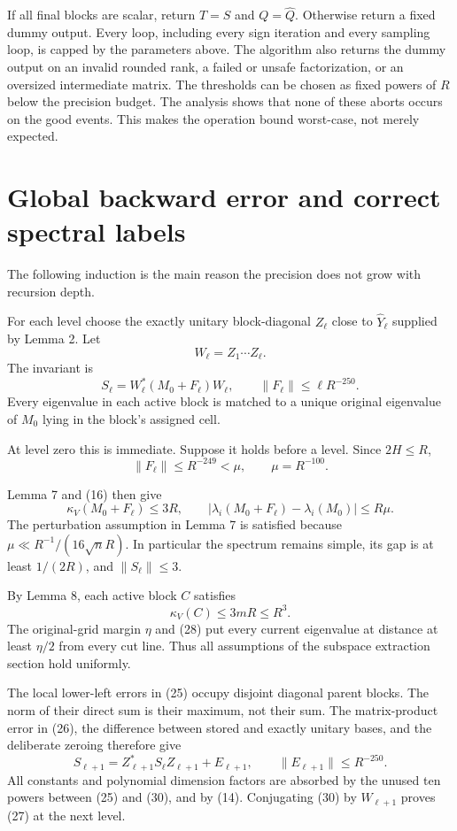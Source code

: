 \documentclass[10pt,a4paper]{article}
\begin{document}
If all final blocks are scalar, return \(T=S\) and \(Q=\widehat Q\).
Otherwise return a fixed dummy output. Every loop, including every sign
iteration and every sampling loop, is capped by the parameters above.
The algorithm also returns the dummy output on an invalid rounded rank,
a failed or unsafe factorization, or an oversized intermediate matrix.
The thresholds can be chosen as fixed powers of \(R\) below the
precision budget. The analysis shows that none of these aborts occurs on
the good events. This makes the operation bound worst-case, not merely
expected.

\section{Global backward error and correct spectral
labels}\label{global-backward-error-and-correct-spectral-labels}

The following induction is the main reason the precision does not grow
with recursion depth.

For each level choose the exactly unitary block-diagonal \(Z_\ell\)
close to \(\widehat Y_\ell\) supplied by Lemma 2. Let \[
 W_\ell=Z_1\cdots Z_\ell.
\] The invariant is \[
 S_\ell=W_\ell^*(M_0+F_\ell)W_\ell,
 \qquad\|F_\ell\|\le\ell R^{-250}.
 \tag{27}
\] Every eigenvalue in each active block is matched to a unique original
eigenvalue of \(M_0\) lying in the block's assigned cell.

At level zero this is immediate. Suppose it holds before a level. Since
\(2H\le R\), \[
 \|F_\ell\|\le R^{-249}<\mu,
 \qquad\mu=R^{-100}.
\]

Lemma 7 and (16) then give \[
 \kappa_V(M_0+F_\ell)\le3R,
 \qquad
 |\lambda_i(M_0+F_\ell)-\lambda_i(M_0)|\le R\mu.
 \tag{28}
\] The perturbation assumption in Lemma 7 is satisfied because
\(\mu\ll R^{-1}/(16\sqrt n R)\). In particular the spectrum remains
simple, its gap is at least \(1/(2R)\), and \(\|S_\ell\|\le3\).

By Lemma 8, each active block \(C\) satisfies \[
 \kappa_V(C)\le3mR\le R^3.
 \tag{29}
\] The original-grid margin \(\eta\) and (28) put every current
eigenvalue at distance at least \(\eta/2\) from every cut line. Thus all
assumptions of the subspace extraction section hold uniformly.

The local lower-left errors in (25) occupy disjoint diagonal parent
blocks. The norm of their direct sum is their maximum, not their sum.
The matrix-product error in (26), the difference between stored and
exactly unitary bases, and the deliberate zeroing therefore give \[
 S_{\ell+1}=Z_{\ell+1}^*S_\ell Z_{\ell+1}+E_{\ell+1},
 \qquad\|E_{\ell+1}\|\le R^{-250}.
 \tag{30}
\] All constants and polynomial dimension factors are absorbed by the
unused ten powers between (25) and (30), and by (14). Conjugating (30)
by \(W_{\ell+1}\) proves (27) at the next level.
\end{document}
